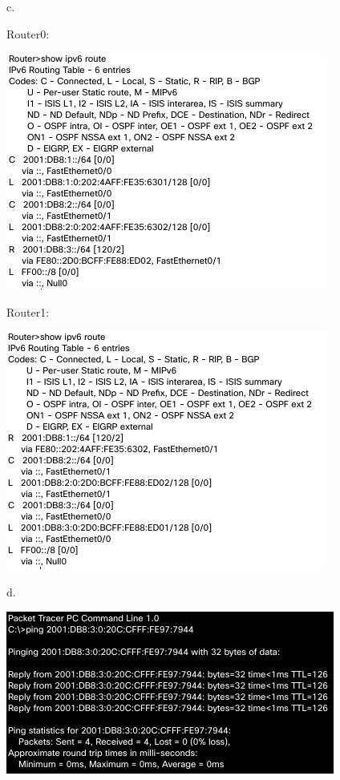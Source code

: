 \documentclass[11pt]{article}
\begin{document}
\begin{enumerate}
c.

Router0:
\begin{center}
\includegraphics[width=.9\linewidth]{./r0route.png}
\end{center}

Router1:
\begin{center}
\includegraphics[width=.9\linewidth]{./r1route.png}
\end{center}

d.

\begin{center}
\includegraphics[width=.9\linewidth]{./ping.png}
\end{center}
\end{enumerate}
\end{document}

